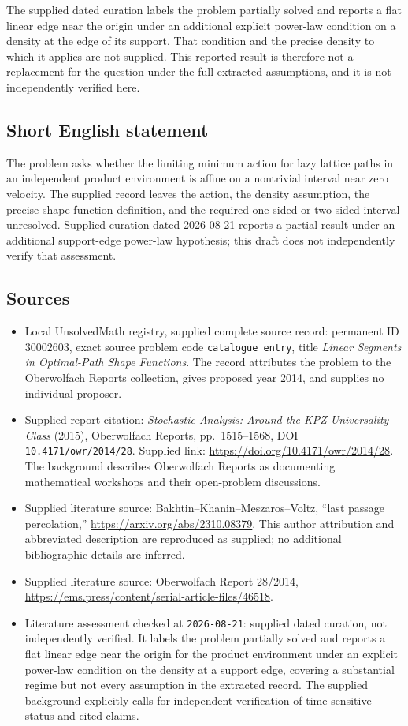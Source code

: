 \documentclass[11pt]{article}
\begin{document}
The supplied dated curation labels the problem partially solved and reports a flat linear edge near the origin under an additional explicit power-law condition on a density at the edge of its support. That condition and the precise density to which it applies are not supplied. This reported result is therefore not a replacement for the question under the full extracted assumptions, and it is not independently verified here.
\subsection{Short English statement}
The problem asks whether the limiting minimum action for lazy lattice paths in an independent product environment is affine on a nontrivial interval near zero velocity. The supplied record leaves the action, the density assumption, the precise shape-function definition, and the required one-sided or two-sided interval unresolved. Supplied curation dated 2026-08-21 reports a partial result under an additional support-edge power-law hypothesis; this draft does not independently verify that assessment.
\subsection{Sources}
\begin{itemize}
\item Local UnsolvedMath registry, supplied complete source record: permanent ID \(30002603\), exact source problem code \texttt{catalogue entry}, title \emph{Linear Segments in Optimal-Path Shape Functions}. The record attributes the problem to the Oberwolfach Reports collection, gives proposed year 2014, and supplies no individual proposer.
\item Supplied report citation: \emph{Stochastic Analysis: Around the KPZ Universality Class} (2015), Oberwolfach Reports, pp.\ 1515--1568, DOI \texttt{10.4171/owr/2014/28}. Supplied link: \url{https://doi.org/10.4171/owr/2014/28}. The background describes Oberwolfach Reports as documenting mathematical workshops and their open-problem discussions.
\item Supplied literature source: Bakhtin--Khanin--Meszaros--Voltz, ``last passage percolation,'' \url{https://arxiv.org/abs/2310.08379}. This author attribution and abbreviated description are reproduced as supplied; no additional bibliographic details are inferred.
\item Supplied literature source: Oberwolfach Report 28/2014, \url{https://ems.press/content/serial-article-files/46518}.
\item Literature assessment checked at \texttt{2026-08-21}: supplied dated curation, not independently verified. It labels the problem partially solved and reports a flat linear edge near the origin for the product environment under an explicit power-law condition on the density at a support edge, covering a substantial regime but not every assumption in the extracted record. The supplied background explicitly calls for independent verification of time-sensitive status and cited claims.
\end{itemize}
\end{document}
